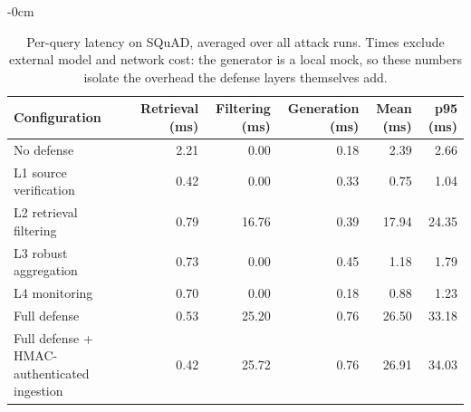 \begin{table}[t]
\begin{adjustwidth}{-\extralength}{0cm}
\footnotesize
\setlength{\tabcolsep}{3pt}
\caption{Per-query latency on SQuAD, averaged over all attack runs. Times exclude external model and network cost: the generator is a local mock, so these numbers isolate the overhead the defense layers themselves add.\label{tab:latency}}
\begin{tabular}{lrrrrr}
\toprule
\textbf{Configuration} & \textbf{Retrieval (ms)} & \textbf{Filtering (ms)} & \textbf{Generation (ms)} & \textbf{Mean (ms)} & \textbf{p95 (ms)}\\
\midrule
No defense & 2.21 & 0.00 & 0.18 & 2.39 & 2.66\\
L1 source verification & 0.42 & 0.00 & 0.33 & 0.75 & 1.04\\
L2 retrieval filtering & 0.79 & 16.76 & 0.39 & 17.94 & 24.35\\
L3 robust aggregation & 0.73 & 0.00 & 0.45 & 1.18 & 1.79\\
L4 monitoring & 0.70 & 0.00 & 0.18 & 0.88 & 1.23\\
Full defense & 0.53 & 25.20 & 0.76 & 26.50 & 33.18\\
Full defense + HMAC-authenticated ingestion & 0.42 & 25.72 & 0.76 & 26.91 & 34.03\\
\bottomrule
\end{tabular}
\end{adjustwidth}
\end{table}
